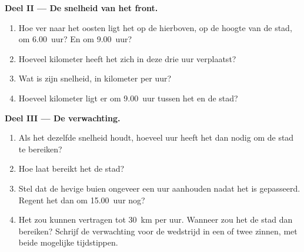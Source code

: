 \begin{problem}
\noindent\textbf{Deel II --- De snelheid van het front.}\par\nopagebreak
\begin{enumerate}[resume, beginpenalty=10000]
  \item Hoe ver naar het oosten ligt het  op de  hierboven, op
        de hoogte van de stad, om 6.00~uur? En om 9.00~uur?
  \item Hoeveel kilometer heeft het  zich in deze drie uur verplaatst?
  \item Wat is zijn snelheid, in kilometer per uur?
  \item Hoeveel kilometer ligt er om 9.00~uur tussen het  en de stad?
\end{enumerate}

\noindent\textbf{Deel III --- De verwachting.}\par\nopagebreak
\begin{enumerate}[resume, beginpenalty=10000]
  \item Als het  dezelfde snelheid houdt, hoeveel uur heeft het dan
        nodig om de stad te bereiken?
  \item Hoe laat bereikt het de stad?
  \item Stel dat de hevige buien ongeveer een uur aanhouden nadat het 
        is gepasseerd. Regent het dan om 15.00~uur nog?
  \item Het  zou kunnen vertragen tot \qty{30}{km} per uur. Wanneer
        zou het de stad dan bereiken? Schrijf de verwachting voor de
        wedstrijd in een of twee zinnen, met beide mogelijke tijdstippen.
\end{enumerate}
\end{problem}

